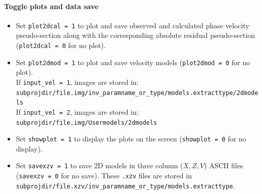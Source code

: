 \documentclass[twoside,a4paper]{article}
\begin{document}
\paragraph{Toggle plots and data save}
\begin{itemize}[leftmargin=*]
\setlength\itemsep{2ex}
\item Set \verb|plot2dcal = 1| to plot and save observed and calculated phase velocity pseudo-section along with the corresponding absolute residual pseudo-section (\verb|plot2dcal = 0| for no plot).

\item Set \verb|plot2dmod = 1| to plot and save velocity models (\verb|plot2dmod = 0| for no plot).\\[1ex]
If \verb|input_vel = 1|, images are stored in:\\
\verb|subprojdir/file.img/inv_paramname_or_type/models.extracttype/2dmodels|\\[1ex]
If \verb|input_vel = 2|, images are stored in:\\
\verb|subprojdir/file.img/Usermodels/2dmodels|

\item Set \verb|showplot = 1| to display the plots on the screen (\verb|showplot = 0| for no display).

\item Set \verb|savexzv = 1| to save 2D models in three column ($X,Z,V$) ASCII files (\verb|savexzv = 0| for no save). These \verb|.xzv| files are stored in \verb|subprojdir/file.xzv/inv_paramname_or_type/models.extracttype|.
\end{itemize}
\end{document}
